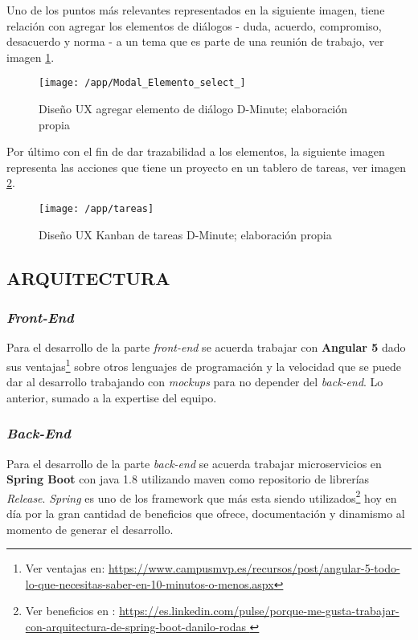 Uno de los puntos más relevantes representados en la siguiente imagen, tiene relación con agregar los elementos de diálogos - duda, acuerdo, compromiso, desacuerdo y norma - a un tema que es parte de una reunión de trabajo, ver imagen \ref{img4-12}.

\begin{figure}[!h]
\centering
\texttt{[image: /app/Modal\_Elemento\_select\_]}
\caption{Diseño UX agregar elemento de diálogo D-Minute; elaboración propia} 
\label{img4-12}
\end{figure}

Por último con el fin de dar trazabilidad a los elementos, la siguiente imagen representa las acciones que tiene un proyecto en un tablero de tareas, ver imagen \ref{img4-13}.

\begin{figure}[!h]
\centering
\texttt{[image: /app/tareas]}
\caption{Diseño UX Kanban de tareas D-Minute; elaboración propia} 
\label{img4-13}
\end{figure}

\subsection{ARQUITECTURA}

\subsubsection{\textit{Front-End}}

Para el desarrollo de la parte \textit{front-end} se acuerda trabajar con \textbf{Angular 5} dado sus ventajas\footnote{Ver ventajas en: \url{https://www.campusmvp.es/recursos/post/angular-5-todo-lo-que-necesitas-saber-en-10-minutos-o-menos.aspx}} sobre otros lenguajes de programación y la velocidad que se puede dar al desarrollo trabajando con \textit{mockups} para no depender del \textit{back-end}. Lo anterior, sumado a la expertise del equipo.

\subsubsection{\textit{Back-End}}

Para el desarrollo de la parte \textit{back-end} se acuerda trabajar microservicios en \textbf{Spring Boot} con java 1.8 utilizando maven como repositorio de librerías \textit{Release}. \textit{Spring} es uno de los framework que más esta siendo utilizados\footnote{Ver beneficios en : \url{https://es.linkedin.com/pulse/porque-me-gusta-trabajar-con-arquitectura-de-spring-boot-danilo-rodas
}} hoy en día por la gran cantidad de beneficios que ofrece, documentación y dinamismo al momento de generar el desarrollo.

